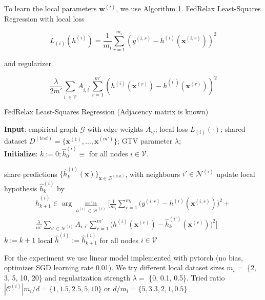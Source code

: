 \documentclass{article}
\newcommand{\graph}{\mathcal{G}}
\begin{document}
To learn the local parameters $\mathbf{w}^{(i)}$, we use Algorithm 1. FedRelax Least-Squares Regression with local loss 

\begin{equation}
{L}_{(i)}({h}^{(i)}) = \frac{1}{{m}_{i}} \sum_{r=1}^{{m}_{i}}\left({y}^{(i,r)} - {h}^{(i)}(\mathbf{x}^{(i,r)}) \right)^2
\end{equation}

and  regularizer 

\begin{equation}
\frac{\lambda}{2m'} \sum_{{i}^{'} \in {\mathcal V}} {A}_{i,{i}^{'}} \sum_{r=1}^{m'} \left({h}^{(i)}(\mathbf{x}^{(r)}) - {h}^{({i}^{'})}(\mathbf{x}^{(r)}) \right)^2
\end{equation}

\newpage
\begin{algorithm}[htbp]
	\caption{FedRelax Least-Squares Regression (Adjacency matrix is known)}
	\label{alg_X_param}
	{\bf Input}: empirical graph $\graph$ with edge weights $A_{ij}$; 
	local loss $L_{(i)}{(\cdot)}$; shared dataset $D^{(test)} = \{\mathbf{x}^{(1)}, ..., \mathbf{x}^{(m')}\}$; GTV parameter $\lambda$; \\
	{\bf Initialize}: $k:=0; \widehat{h}_{0}^{(i)} \!\equiv\!$ for all nodes $i \in \mathcal{V}$.
	\begin{algorithmic}[1]
		\State share predictions $\{\widehat{h}_{k}^{(i)}(\mathbf{x})\}_{\mathbf{x} \in \mathcal{D}^(test)}$, 
		with neighbours $i' \in \mathcal{N}^{(i)}$ 
		\State update local hypothesis $\widehat{h}_{k}^{(i)}$ by
            \begin{multline*}
            \widehat{h}_{k+1}^{(i)} \in  \arg \min_{h^{(i)} \in \mathcal{H}^{(i)}} 
            \biggl[ \frac{1}{m_i}  \sum_{r=1}^{m_i} \biggl( y^{(i,r)} - h^{(i)}(\mathbf{x}^{(i,r)})  \biggr)^2 + \\
            \frac{\lambda}{m'} \sum_{i' \in \mathcal{N}^{(i)}}A_{i,i'}\sum_{r=1}^{m'} \biggl( h^{(i)}(\mathbf{x}^{(r)}) - \widehat{h}_{k}^{(i')}(\mathbf{x}^{(r)}) \biggr)^2 \biggr]
            \end{multline*}
		\EndFor
		\State $k := k+1$
		\EndWhile
			  \Ensure local $\widehat{h}^{(i)} := \widehat{h}_{k+1}^{(i)}$ for all nodes $i \in \mathcal{V}$
	\end{algorithmic}
\end{algorithm}

For the experiment we use linear model implemented with pytorch (no bias, optimizer SGD learning rate 0.01). We try different local dataset sizes $m_i =$ \{2, 3, 5, 10, 20\} and regularization strength $\lambda =$ \{0, 0.1, 0.5\}. Tried ratio $|\mathcal{C}^{(i)}|m_i / d = \{1, 1.5, 2.5, 5, 10\}$ or $d / m_i = \{5, 3.3, 2, 1, 0.5\}$ 
\end{document}
